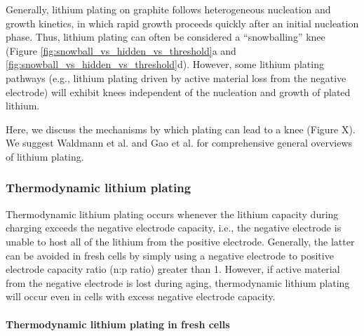 \documentclass[journal=jpclcd,manuscript=article]{achemso}
\begin{document}
Generally, lithium plating on graphite follows heterogeneous nucleation and growth kinetics, in which rapid growth proceeds quickly after an initial nucleation phase.\cite{ely_heterogeneous_2013, pei_nanoscale_2017, gao_interplay_2021}
Thus, lithium plating can often be considered a ``snowballing'' knee (Figure \ref{fig:snowball_vs_hidden_vs_threshold}a and \ref{fig:snowball_vs_hidden_vs_threshold}d). However, some lithium plating pathways (e.g., lithium plating driven by active material loss from the negative electrode) will exhibit knees independent of the nucleation and growth of plated lithium.

Here, we discuss the mechanisms by which plating can lead to a knee (Figure X). We suggest Waldmann et al.\cite{waldmann_li_2018} and Gao et al.\cite{gao_interplay_2021} for comprehensive general overviews of lithium plating.


\subsubsection{Thermodynamic lithium plating}


Thermodynamic lithium plating occurs whenever the lithium capacity during charging exceeds the negative electrode capacity, i.e., the negative electrode is unable to host all of the lithium from the positive electrode. Generally, the latter can be avoided in fresh cells by simply using a negative electrode to positive electrode capacity ratio (n:p ratio) greater than 1. However, if active material from the negative electrode is lost during aging, thermodynamic lithium plating will occur even in cells with excess negative electrode capacity.

\paragraph{Thermodynamic lithium plating in fresh cells}
\end{document}
